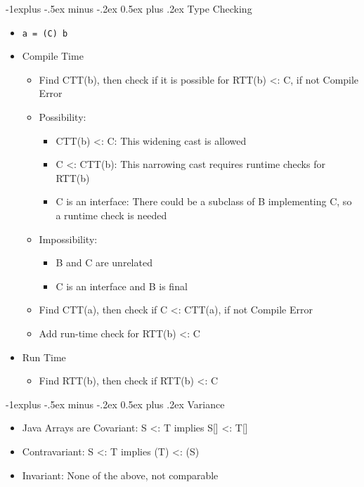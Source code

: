 \documentclass[10pt, landscape]{article}
\makeatletter
\renewcommand{\section}{\@startsection{section}{1}{0mm}%
                                {-1ex plus -.5ex minus -.2ex}%
                                {0.5ex plus .2ex}%
                                {\normalfont\large\bfseries}}
\renewcommand{\section}{\@startsection{section}{2}{0mm}%
                                {-1explus -.5ex minus -.2ex}%
                                {0.5ex plus .2ex}%
                                {\normalfont\normalsize\bfseries}}
\makeatother
\begin{document}
\begin{multicols*}{4}
\section{Type Checking}
\begin{itemize}
    \item \verb|a = (C) b|
    \item Compile Time
    \begin{itemize}
        \item Find CTT(b), then check if it is possible for RTT(b) <: C, if not Compile Error
        \item Possibility:
        \begin{itemize}
            \item CTT(b) <: C: This widening cast is allowed
            \item C <: CTT(b): This narrowing cast requires runtime checks for RTT(b)
            \item C is an interface: There could be a subclass of B implementing C, so a runtime check is needed
        \end{itemize}
        \item Impossibility:
        \begin{itemize}
            \item B and C are unrelated
            \item C is an interface and B is final
        \end{itemize}
        \item Find CTT(a), then check if C <: CTT(a), if not Compile Error
        \item Add run-time check for RTT(b) <: C
    \end{itemize}
    \item Run Time
    \begin{itemize}
        \item Find RTT(b), then check if RTT(b) <: C
    \end{itemize}
\end{itemize}

\section{Variance}
\begin{itemize}
    \item Java Arrays are Covariant: S <: T implies S[] <: T[]
    \item Contravariant: S <: T implies (T) <: (S)
    \item Invariant: None of the above, not comparable
\end{itemize}


\end{multicols*}
\end{document}
